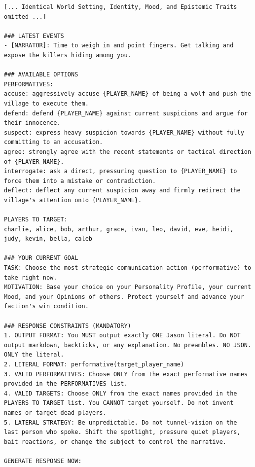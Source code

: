 \begin{lstlisting}[frame=single, basicstyle=\scriptsize\ttfamily, breaklines=true, caption={Cropped prompt for the \texttt{get\_valid\_performative} action, generated for a Villager agent to determine its rhetorical intent prior to speech generation.}, label={lst:get_performative}]
[... Identical World Setting, Identity, Mood, and Epistemic Traits omitted ...]

### LATEST EVENTS
- [NARRATOR]: Time to weigh in and point fingers. Get talking and expose the killers hiding among you.

### AVAILABLE OPTIONS
PERFORMATIVES:
accuse: aggressively accuse {PLAYER_NAME} of being a wolf and push the village to execute them.
defend: defend {PLAYER_NAME} against current suspicions and argue for their innocence.
suspect: express heavy suspicion towards {PLAYER_NAME} without fully committing to an accusation.
agree: strongly agree with the recent statements or tactical direction of {PLAYER_NAME}.
interrogate: ask a direct, pressuring question to {PLAYER_NAME} to force them into a mistake or contradiction.
deflect: deflect any current suspicion away and firmly redirect the village's attention onto {PLAYER_NAME}.

PLAYERS TO TARGET:
charlie, alice, bob, arthur, grace, ivan, leo, david, eve, heidi, judy, kevin, bella, caleb

### YOUR CURRENT GOAL
TASK: Choose the most strategic communication action (performative) to take right now.
MOTIVATION: Base your choice on your Personality Profile, your current Mood, and your Opinions of others. Protect yourself and advance your faction's win condition.

### RESPONSE CONSTRAINTS (MANDATORY)
1. OUTPUT FORMAT: You MUST output exactly ONE Jason literal. Do NOT output markdown, backticks, or any explanation. No preambles. NO JSON. ONLY the literal.
2. LITERAL FORMAT: performative(target_player_name)
3. VALID PERFORMATIVES: Choose ONLY from the exact performative names provided in the PERFORMATIVES list.
4. VALID TARGETS: Choose ONLY from the exact names provided in the PLAYERS TO TARGET list. You CANNOT target yourself. Do not invent names or target dead players.
5. LATERAL STRATEGY: Be unpredictable. Do not tunnel-vision on the last person who spoke. Shift the spotlight, pressure quiet players, bait reactions, or change the subject to control the narrative.

GENERATE RESPONSE NOW:
\end{lstlisting}

